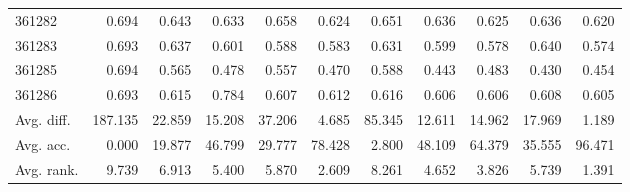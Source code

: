 \begin{tabular}{lrrrrrrrrrr}
361282 & 0.694 & 0.643 & 0.633 & 0.658 & 0.624 & 0.651 & 0.636 & 0.625 & 0.636 & 0.620 \\
361283 & 0.693 & 0.637 & 0.601 & 0.588 & 0.583 & 0.631 & 0.599 & 0.578 & 0.640 & 0.574 \\
361285 & 0.694 & 0.565 & 0.478 & 0.557 & 0.470 & 0.588 & 0.443 & 0.483 & 0.430 & 0.454 \\
361286 & 0.693 & 0.615 & 0.784 & 0.607 & 0.612 & 0.616 & 0.606 & 0.606 & 0.608 & 0.605 \\
Avg. diff. & 187.135 & 22.859 & 15.208 & 37.206 & 4.685 & 85.345 & 12.611 & 14.962 & 17.969 & 1.189 \\
Avg. acc. & 0.000 & 19.877 & 46.799 & 29.777 & 78.428 & 2.800 & 48.109 & 64.379 & 35.555 & 96.471 \\
Avg. rank. & 9.739 & 6.913 & 5.400 & 5.870 & 2.609 & 8.261 & 4.652 & 3.826 & 5.739 & 1.391 \\
\bottomrule
\end{tabular}
